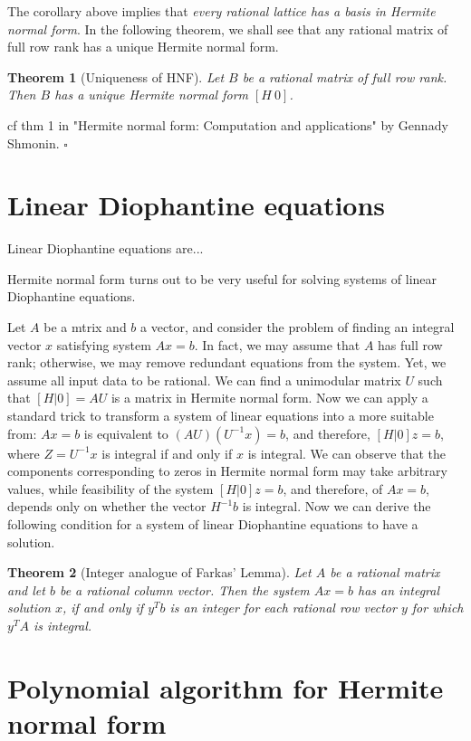 \documentclass{article}
\newcounter{lecnum}
\newtheorem{theorem}{Theorem}[lecnum]
\newenvironment{proof}{{\it Proof.}}{ \hfill $\square$}
\begin{document}
The corollary above implies that \emph{every rational lattice has a basis in Hermite normal form}. In the following theorem, we shall see that any rational matrix of full row rank has a unique Hermite normal form.

\begin{theorem}[Uniqueness of HNF]
Let $B$ be a rational matrix of full row rank. Then $B$ has a unique Hermite normal form $[H~0]$.
\end{theorem}
\begin{proof}
cf thm 1 in "Hermite normal form: Computation and applications" by Gennady Shmonin.
\end{proof}

\section{Linear Diophantine equations}
Linear Diophantine equations are...

Hermite normal form turns out to be very useful for solving systems of linear Diophantine equations.

Let $A$ be a mtrix and $b$ a vector, and consider the problem of finding an integral vector $x$ satisfying system $Ax=b$. In fact, we may assume that $A$ has full row rank; otherwise, we may remove redundant equations from the system. Yet, we assume all input data to be rational. We can find a unimodular matrix $U$ such that $[H|0]=AU$ is a matrix in Hermite normal form. Now we can apply a standard trick to transform a system of linear equations into a more suitable from: $Ax=b$ is equivalent to $(AU)(U^{-1}x)=b$, and therefore, $[H|0]z=b$, where $Z=U^{-1}x$ is integral if and only if $x$ is integral. We can observe that the components corresponding to zeros in Hermite normal form may take arbitrary values, while feasibility of the system $[H|0]z=b$, and therefore, of $Ax=b$, depends only on whether the vector $H^{-1}b$ is integral. Now we can derive the following condition for a system of linear Diophantine equations to have a solution.

\begin{theorem}[Integer analogue of Farkas' Lemma]
Let $A$ be a rational matrix and let $b$ be a rational column vector. Then the system $Ax=b$ has an integral solution $x$, if and only if $y^T b$ is an integer for each rational row vector $y$ for which $y^T A$ is integral.
\end{theorem}

\section{Polynomial algorithm for Hermite normal form}
\end{document}
